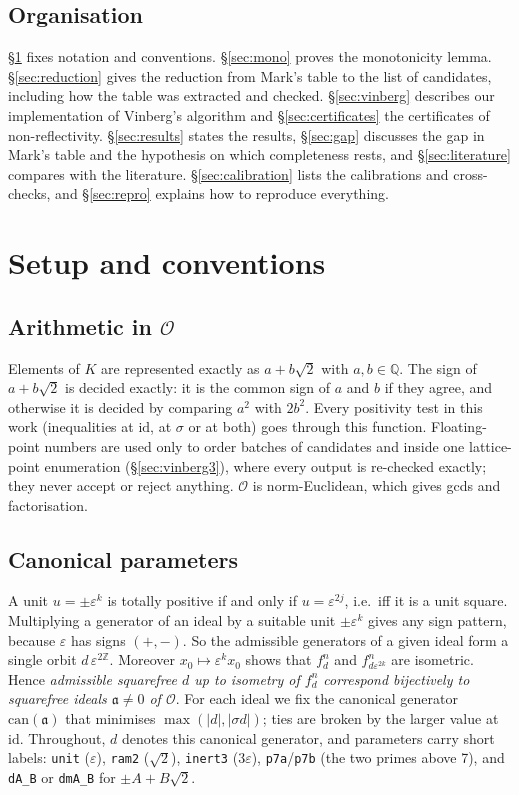 \documentclass[11pt]{amsart}
\theoremstyle{definition}
\newcommand{\Z}{\mathbb{Z}}
\newcommand{\Q}{\mathbb{Q}}
\newcommand{\OK}{\mathcal{O}}
\newcommand{\eps}{\varepsilon}
\newcommand{\id}{\mathrm{id}}
\newcommand{\lab}[1]{\texttt{#1}}
\begin{document}
\subsection*{Organisation}
\S\ref{sec:setup} fixes notation and conventions. \S\ref{sec:mono} proves the monotonicity
lemma. \S\ref{sec:reduction} gives the reduction from Mark's table to the list of candidates,
including how the table was extracted and checked. \S\ref{sec:vinberg} describes our
implementation of Vinberg's algorithm and \S\ref{sec:certificates} the certificates of
non-reflectivity. \S\ref{sec:results} states the results, \S\ref{sec:gap} discusses the gap
in Mark's table and the hypothesis on which completeness rests, and \S\ref{sec:literature}
compares with the literature. \S\ref{sec:calibration} lists the calibrations and
cross-checks, and \S\ref{sec:repro} explains how to reproduce everything.

\section{Setup and conventions}\label{sec:setup}

\subsection{Arithmetic in $\OK$}
Elements of $K$ are represented exactly as $a+b\sqrt2$ with $a,b\in\Q$. The sign of
$a+b\sqrt2$ is decided exactly: it is the common sign of $a$ and $b$ if they agree, and
otherwise it is decided by comparing $a^2$ with $2b^2$. Every positivity test in this work
(inequalities at $\id$, at $\sigma$ or at both) goes through this function. Floating-point
numbers are used only to order batches of candidates and inside one lattice-point
enumeration (\S\ref{sec:vinberg3}), where every output is re-checked exactly; they never
accept or reject anything. $\OK$ is norm-Euclidean, which gives gcds and factorisation.

\subsection{Canonical parameters}\label{sec:canonical}
A unit $u=\pm\eps^k$ is totally positive if and only if $u=\eps^{2j}$, i.e.\ iff it is a unit
square. Multiplying a generator of an ideal by a suitable unit $\pm\eps^k$ gives any sign
pattern, because $\eps$ has signs $(+,-)$. So the admissible generators of a given ideal form
a single orbit $d\,\eps^{2\Z}$. Moreover $x_0\mapsto\eps^k x_0$ shows that $f_d^n$ and
$f_{d\eps^{2k}}^n$ are isometric. Hence \emph{admissible squarefree $d$ up to isometry of
$f_d^n$ correspond bijectively to squarefree ideals $\mathfrak a\ne0$ of $\OK$}. For each
ideal we fix the canonical generator $\mathrm{can}(\mathfrak a)$ that minimises
$\max(|d|,|\sigma d|)$; ties are broken by the larger value at $\id$. Throughout, $d$ denotes
this canonical generator, and parameters carry short labels: \lab{unit} ($\eps$), \lab{ram2}
($\sqrt2$), \lab{inert3} ($3\eps$), \lab{p7a}/\lab{p7b} (the two primes above 7), and
\lab{dA\_B} or \lab{dmA\_B} for $\pm A+B\sqrt2$.
\end{document}
